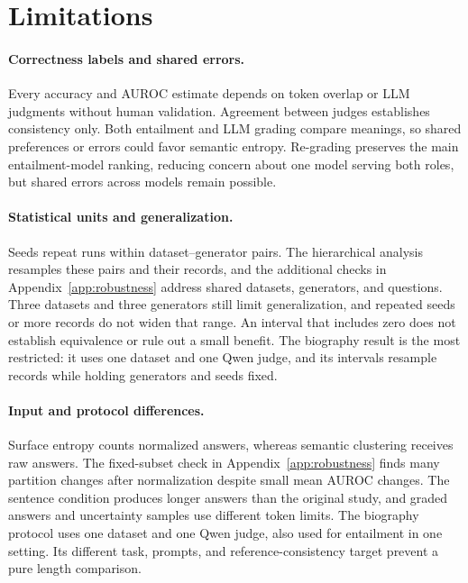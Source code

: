 \section{Limitations}
\label{sec:conclusion-limitations}

\paragraph{Correctness labels and shared errors.}
Every accuracy and AUROC estimate depends on token overlap or LLM judgments
without human validation. Agreement between judges establishes consistency
only. Both entailment and LLM grading compare meanings, so shared preferences
or errors could favor semantic entropy. Re-grading preserves the main
entailment-model ranking, reducing concern about one model serving both roles,
but shared errors across models remain possible.

\paragraph{Statistical units and generalization.}
Seeds repeat runs within dataset--generator pairs. The hierarchical analysis
resamples these pairs and their records, and the additional checks in
Appendix~\ref{app:robustness} address shared datasets, generators, and questions.
Three datasets and three generators still limit generalization, and repeated
seeds or more records do not widen that range. An interval that includes zero
does not establish equivalence or rule out a small benefit. The biography
result is the most restricted: it uses one dataset and one Qwen judge, and its
intervals resample records while holding generators and seeds fixed.

\paragraph{Input and protocol differences.}
Surface entropy counts normalized answers, whereas semantic clustering receives
raw answers. The fixed-subset check in Appendix~\ref{app:robustness} finds many
partition changes after normalization despite small mean AUROC changes.
The sentence condition produces longer answers than the original study, and
graded answers and uncertainty samples use different token limits. The
biography protocol uses one dataset and one Qwen judge, also used for entailment
in one setting. Its different task, prompts, and reference-consistency target
prevent a pure length comparison.

